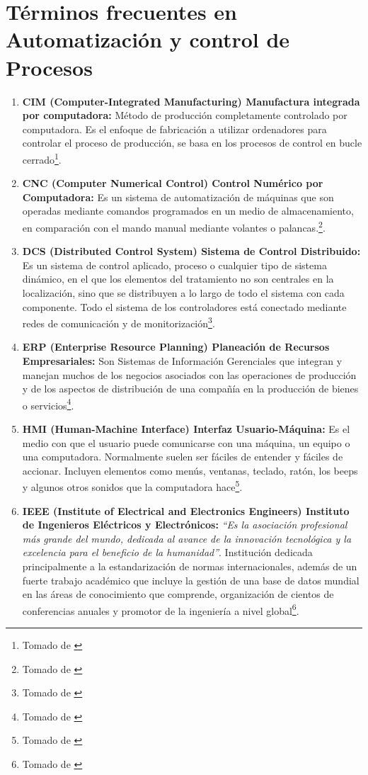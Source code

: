 \documentclass[10pt,graphicx,caption,rotating]{article}
\begin{document}
\section[Siglas]{Términos frecuentes en Automatización y control de Procesos}
\begin{enumerate}
 \item \textbf{CIM (Computer-Integrated Manufacturing) Manufactura integrada por computadora:} Método de producción completamente controlado por computadora. Es el enfoque de fabricación a utilizar ordenadores para controlar el proceso de producción, se basa en los procesos de control en bucle cerrado\footnote{Tomado de \cite{page3}}.

 \item \textbf{CNC (Computer Numerical Control) Control Numérico por Computadora:} Es un sistema de automatización de máquinas que son operadas mediante comandos programados en un medio de almacenamiento, en comparación con el mando manual mediante volantes o palancas.\footnote{Tomado de \cite{page4}}.

 \item \textbf{DCS (Distributed Control System) Sistema de Control Distribuido:} Es un sistema de control aplicado, proceso o cualquier tipo de sistema dinámico, en el que los elementos del tratamiento no son centrales en la localización, sino que se distribuyen a lo largo de todo el sistema con cada componente. Todo el sistema de los controladores está conectado mediante redes de comunicación y de monitorización\footnote{Tomado de \cite{page5}}.

 \item \textbf{ERP (Enterprise Resource Planning) Planeación de Recursos Empresariales:} Son Sistemas de Información Gerenciales que integran y manejan muchos de los negocios asociados con las operaciones de producción y de los aspectos de distribución de una compañía en la producción de bienes o servicios\footnote{Tomado de \cite{page6}}.

 \item \textbf{HMI (Human-Machine Interface) Interfaz Usuario-Máquina:} Es el medio con que el usuario puede comunicarse con una máquina, un equipo o una computadora. Normalmente suelen ser fáciles de entender y fáciles de accionar. Incluyen elementos como menús, ventanas, teclado, ratón, los beeps y algunos otros sonidos que la computadora hace\footnote{Tomado de \cite{page7}}.

 \item \textbf{IEEE (Institute of Electrical and Electronics Engineers) Instituto de Ingenieros Eléctricos y Electrónicos:} \textit{``Es la asociación profesional más grande del mundo, dedicada al avance de la innovación tecnológica y la excelencia para el beneficio de la humanidad''}. Institución dedicada principalmente a la estandarización de normas internacionales, además de un fuerte trabajo académico que incluye la gestión de una base de datos mundial en las áreas de conocimiento que comprende, organización de cientos de conferencias anuales y promotor de la ingeniería a nivel global\footnote{Tomado de \cite{page8}}.


\end{enumerate}
\end{document}
